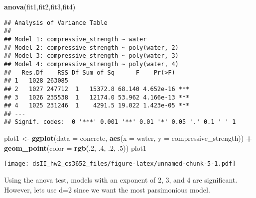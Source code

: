 \documentclass[]{article}
\newenvironment{Shaded}{\begin{snugshade}}{\end{snugshade}}
\newcommand{\KeywordTok}[1]{\textcolor[rgb]{0.13,0.29,0.53}{\textbf{#1}}}
\newcommand{\DataTypeTok}[1]{\textcolor[rgb]{0.13,0.29,0.53}{#1}}
\newcommand{\DecValTok}[1]{\textcolor[rgb]{0.00,0.00,0.81}{#1}}
\newcommand{\StringTok}[1]{\textcolor[rgb]{0.31,0.60,0.02}{#1}}
\newcommand{\OperatorTok}[1]{\textcolor[rgb]{0.81,0.36,0.00}{\textbf{#1}}}
\newcommand{\NormalTok}[1]{#1}
\begin{document}
\begin{Shaded}
\begin{Highlighting}[]
\KeywordTok{anova}\NormalTok{(fit1,fit2,fit3,fit4) }
\end{Highlighting}
\end{Shaded}

\begin{verbatim}
## Analysis of Variance Table
## 
## Model 1: compressive_strength ~ water
## Model 2: compressive_strength ~ poly(water, 2)
## Model 3: compressive_strength ~ poly(water, 3)
## Model 4: compressive_strength ~ poly(water, 4)
##   Res.Df    RSS Df Sum of Sq      F    Pr(>F)    
## 1   1028 263085                                  
## 2   1027 247712  1   15372.8 68.140 4.652e-16 ***
## 3   1026 235538  1   12174.0 53.962 4.166e-13 ***
## 4   1025 231246  1    4291.5 19.022 1.423e-05 ***
## ---
## Signif. codes:  0 '***' 0.001 '**' 0.01 '*' 0.05 '.' 0.1 ' ' 1
\end{verbatim}

\begin{Shaded}
\begin{Highlighting}[]
\NormalTok{plot1 <-}\StringTok{ }\KeywordTok{ggplot}\NormalTok{(}\DataTypeTok{data =}\NormalTok{ concrete, }\KeywordTok{aes}\NormalTok{(}\DataTypeTok{x =}\NormalTok{ water, }\DataTypeTok{y =}\NormalTok{ compressive_strength)) }\OperatorTok{+}
\StringTok{     }\KeywordTok{geom_point}\NormalTok{(}\DataTypeTok{color =} \KeywordTok{rgb}\NormalTok{(.}\DecValTok{2}\NormalTok{, .}\DecValTok{4}\NormalTok{, .}\DecValTok{2}\NormalTok{, .}\DecValTok{5}\NormalTok{))}
\NormalTok{plot1}
\end{Highlighting}
\end{Shaded}

\texttt{[image: dsII\_hw2\_cs3652\_files/figure-latex/unnamed-chunk-5-1.pdf]}

Using the anova test, models with an exponent of 2, 3, and 4 are
significant. However, lets use d=2 since we want the most parsimonious
model.
\end{document}

